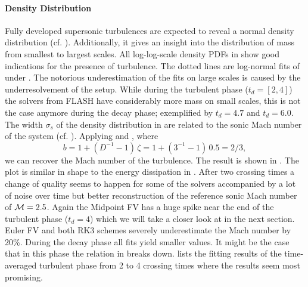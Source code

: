\paragraph{Density Distribution}
Fully developed supersonic turbulences are expected to reveal a normal
density distribution (cf. ). Additionally, it gives
an insight into the distribution of mass from smallest to largest scales.
All log-log-scale density PDFs in 
show good indications for the presence of turbulence. The dotted lines are
log-normal fits of  under . The notorious
underestimation of the fits on large scales is caused by the underresolvement
of the setup. While during the turbulent phase
($t_d = [2,4]$) the solvers from FLASH have considerably more mass on small
scales, this is not the case anymore during the decay phase; exemplified by
$t_d = 4.7$ and $t_d = 6.0$.
The width $\sigma_s$ of the density distribution in
 are related to the sonic Mach
number of the system (cf. ). Applying
 and , where
\begin{equation}
b = 1 + (D^{-1} - 1) \, \zeta = 1 + (3^{-1} - 1) \, 0.5 = 2/3,
\end{equation}
we can recover the Mach number of the turbulence. The result is shown in
. The plot is similar in shape to
the energy dissipation in .
After two crossing times a change of quality seems to happen for some of the
solvers accompanied by a lot of noise over time but better reconstruction of
the reference sonic Mach number of $\mathcal{M} = 2.5$. Again the Midpoint FV has a huge
spike near the end of the turbulent  phase ($t_d = 4$) which we will take a closer
look at in the next section. Euler FV and both RK3 schemes severely
underestimate the Mach number by 20\%. During the decay phase all fits
yield smaller values. It might be the case that in this phase the relation
in  breaks down.  lists the fitting results
of the time-averaged turbulent phase from 2 to 4 crossing times where the results
seem most promising.

